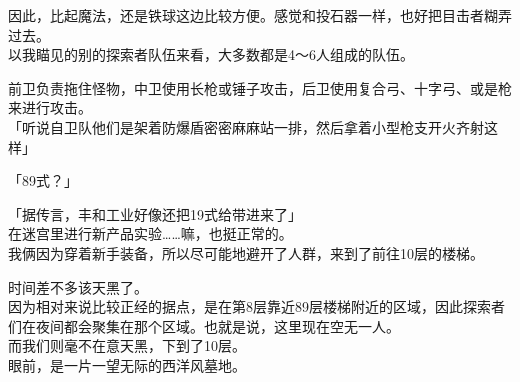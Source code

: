 因此，比起魔法，还是铁球这边比较方便。感觉和投石器一样，也好把目击者糊弄过去。\\

以我瞄见的别的探索者队伍来看，大多数都是4～6人组成的队伍。

前卫负责拖住怪物，中卫使用长枪或锤子攻击，后卫使用复合弓、十字弓、或是枪来进行攻击。\\

「听说自卫队他们是架着防爆盾密密麻麻站一排，然后拿着小型枪支开火齐射这样」

「89式？」

「据传言，丰和工业好像还把19式给带进来了」\\

在迷宫里进行新产品实验……嘛，也挺正常的。\\

我俩因为穿着新手装备，所以尽可能地避开了人群，来到了前往10层的楼梯。

时间差不多该天黑了。\\

因为相对来说比较正经的据点，是在第8层靠近89层楼梯附近的区域，因此探索者们在夜间都会聚集在那个区域。也就是说，这里现在空无一人。\\

而我们则毫不在意天黑，下到了10层。\\

% 


眼前，是一片一望无际的西洋风墓地。\\

